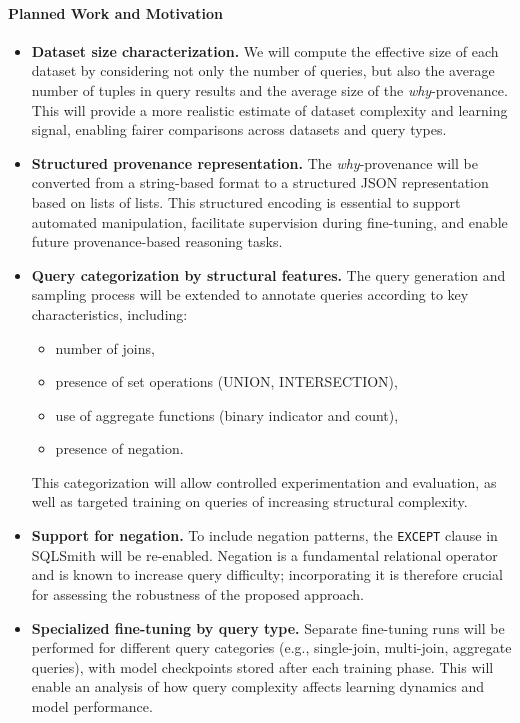 \documentclass{article}
\begin{document}
\paragraph{Planned Work and Motivation}
\begin{itemize}
    \item \textbf{Dataset size characterization.}  
    We will compute the effective size of each dataset by considering not only the number of queries, but also the average number of tuples in query results and the average size of the \textit{why}-provenance. This will provide a more realistic estimate of dataset complexity and learning signal, enabling fairer comparisons across datasets and query types.

    \item \textbf{Structured provenance representation.}  
    The \textit{why}-provenance will be converted from a string-based format to a structured JSON representation based on lists of lists. This structured encoding is essential to support automated manipulation, facilitate supervision during fine-tuning, and enable future provenance-based reasoning tasks.

    \item \textbf{Query categorization by structural features.}  
    The query generation and sampling process will be extended to annotate queries according to key characteristics, including:
    \begin{itemize}
        \item number of joins,
        \item presence of set operations (UNION, INTERSECTION),
        \item use of aggregate functions (binary indicator and count),
        \item presence of negation.
    \end{itemize}
    This categorization will allow controlled experimentation and evaluation, as well as targeted training on queries of increasing structural complexity.

    \item \textbf{Support for negation.}  
    To include negation patterns, the \texttt{EXCEPT} clause in SQLSmith will be re-enabled. Negation is a fundamental relational operator and is known to increase query difficulty; incorporating it is therefore crucial for assessing the robustness of the proposed approach.

    \item \textbf{Specialized fine-tuning by query type.}  
    Separate fine-tuning runs will be performed for different query categories (e.g., single-join, multi-join, aggregate queries), with model checkpoints stored after each training phase. This will enable an analysis of how query complexity affects learning dynamics and model performance.


\end{itemize}
\end{document}
